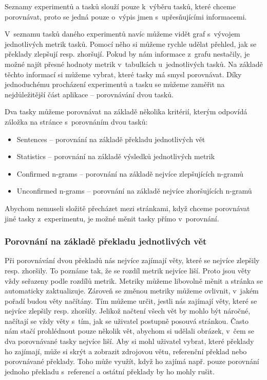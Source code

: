 Seznamy experimentů a tasků slouží pouze k~výběru tasků,
  které chceme porovnávat,
  proto se jedná pouze o~výpis jmen s~upřesňujícími informacemi.

V~seznamu tasků daného experimentů navíc můžeme vidět graf s~vývojem jednotlivých metrik tasků.
Pomocí něho si můžeme rychle udělat přehled,
  jak se překlady zlepšují resp. zhoršují.
Pokud by nám informace z~grafu nestačily,
  je možné najít přesné hodnoty metrik v~tabulkách u~jednotlivých tasků.
Na základě těchto informací si můžeme vybrat,
  které tasky má smysl porovnávat.
Díky jednoduchému procházení experimentů a tasku se můžeme zaměřit na nejdůležitější část aplikace
  -- porovnávání dvou tasků.

Dva tasky můžeme porovnávat na základě několika kritérií,
  kterým odpovídá záložka na stránce s~porovnáním dvou tasků:
\begin{itemize}
  \item Sentences -- porovnání na základě překladu jednotlivých vět
  \item Statistics -- porovnání na základě výsledků jednotlivých metrik
  \item Confirmed \mbox{n-grams} -- porovnání na základě nejvíce zlepšujících \mbox{n-gramů}
  \item Unconfirmed \mbox{n-grams} -- porovnání na základě nejvíce zhoršujících \mbox{n-gramů}
\end{itemize}

Abychom nemuseli složitě přecházet mezi stránkami,
  když chceme porovnávat jiné tasky z~experimentu,
  je možné měnit tasky přímo v~porovnání.


\subsubsection{Porovnání na základě překladu jednotlivých vět}
Při porovnávání dvou překladů nás nejvíce zajímají věty,
  které se nejvíce zlepšily resp. zhoršily.
To poznáme tak, že se rozdíl metrik nejvíce liší. 
Proto jsou věty vždy seřazeny podle rozdílů metrik.
Metriky můžeme libovolně měnit a stránka se automaticky zaktualizuje.
Zároveň se změnou metriky můžeme ovlivnit,
  v~jakém pořadí budou věty načítány.
Tím můžeme určit,
  jestli nás zajímají věty,
  které se nejvíce zlepšily resp. zhoršily.
Jelikož načtení všech vět by mohlo být náročné,
  načítají se vždy věty s~tím,
  jak se uživatel postupně posouvá stránkou.
Často nám stačí prohlédnout pouze několik vět,
  abychom si udělali obrázek,
  v~čem se dva porovnávané tasky nejvíce liší.
Aby si mohl uživatel vybrat,
  které překlady ho zajímají,
  může si skrýt a zobrazit zdrojovou větu, referenční překlad nebo porovnávané překlady.
Toho může využít, když ho zajímá např. pouze porovnání jednoho překladu s~referencí a
  ostátní překlady by ho mohly rušit.

